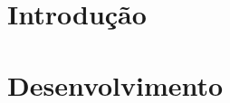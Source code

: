 \documentclass[11pt,a4paper,titlepage,openright,oneside]{book}
\begin{document}
\paginadededicatorias





\sumario
\listadefiguras
\listadetabelas



\mainmatter
\setcounter{page}{1}  \pagestyle{plain}

\part{Introdução}




\part{Desenvolvimento}
 
\end{document}
